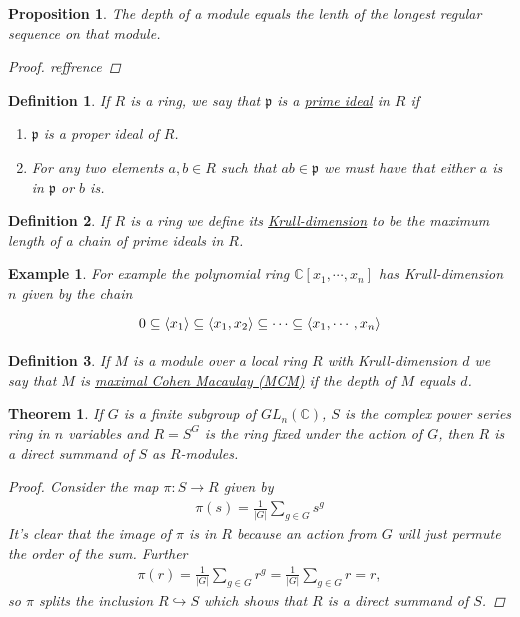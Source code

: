 \documentclass[11pt, a4paper, english]{article}
\newtheorem{prop}{Proposition}
\numberwithin{prop}{section}
\numberwithin{lemma}{section}
\newtheorem{theorem}{Theorem}
\numberwithin{theorem}{section}
\newtheorem{defin}{Definition}
\numberwithin{defin}{section}
\newtheorem{example}{Example}
\numberwithin{example}{section}
\newcommand{\C}{\mathbb{C}}
\begin{document}
\begin{prop}
The depth of a module equals the lenth of the longest regular sequence on that module.
\begin{proof}
{\color{red} reffrence}
\end{proof}
\end{prop}

\begin{defin}
If $R$ is a ring, we say that $\mathfrak{p}$ is  a \underline{prime ideal} in $R$ if
\begin{enumerate}
\item $\mathfrak{p}$ is a proper ideal of $R$.
\item For any two elements $a,b \in R$ such that $ab \in \mathfrak{p}$ we must have that either $a$ is in $\mathfrak{p}$ or $b$ is.
\end{enumerate}
\end{defin}

\begin{defin}
If $R$ is a ring we define its \underline{Krull-dimension} to be the maximum length of a chain of prime ideals in $R$. 
\end{defin}
\begin{example}
For example the polynomial ring $\C[x_1, \cdots, x_n]$ has Krull-dimension $n$ given by the chain
\begin{equation*}
\begin{tikzcd}
0 \subseteq \langle x_1 \rangle \subseteq \langle x_1, x_2 \rangle \subseteq \cdots \subseteq \langle x_1, \cdots, x_n \rangle
\end{tikzcd}
\end{equation*}
\end{example}

\begin{defin}
If $M$ is a module over a local ring $R$ with Krull-dimension $d$ we say that $M$ is \underline{maximal Cohen Macaulay (MCM)} if the depth of $M$ equals $d$.
\end{defin}

\begin{theorem}
If $G$ is a finite subgroup of $GL_n(\C)$, $S$ is the complex power series ring in $n$ variables and $R = S^G$ is the ring fixed under the action of $G$, then $R$ is a direct summand of $S$ as $R$-modules.

\begin{proof}
Consider the map $\pi: S \to R$ given by
\begin{align*}
\pi(s) = \frac{1}{|G|} \sum_{g\in G} s^g
\end{align*}
It's clear that the image of $\pi$ is in $R$ because an action from $G$ will just permute the order of the sum. Further \begin{align*}
\pi(r) = \frac{1}{|G|} \sum_{g\in G} r^g = \frac{1}{|G|} \sum_{g\in G} r = r,
\end{align*}
so $\pi$ splits the inclusion $R \hookrightarrow S$ which shows that $R$ is a direct summand of $S$.
\end{proof}
\end{theorem}
\end{document}
